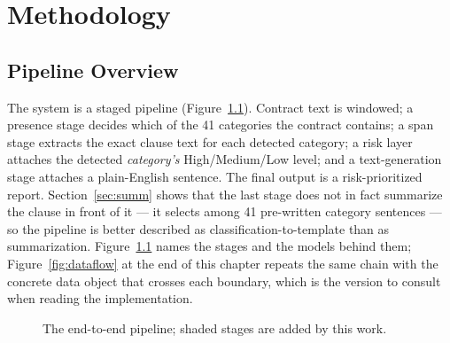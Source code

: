 \chapter{Methodology}

\section{Pipeline Overview}
The system is a staged pipeline (Figure~\ref{fig:pipeline}). Contract text is windowed; a presence stage decides which of the 41 categories the contract contains; a span stage extracts the exact clause text for each detected category; a risk layer attaches the detected \emph{category's} High/Medium/Low level; and a text-generation stage attaches a plain-English sentence. The final output is a risk-prioritized report. Section~\ref{sec:summ} shows that the last stage does not in fact summarize the clause in front of it --- it selects among 41 pre-written category sentences --- so the pipeline is better described as classification-to-template than as summarization. Figure~\ref{fig:pipeline} names the stages and the models behind them; Figure~\ref{fig:dataflow} at the end of this chapter repeats the same chain with the concrete data object that crosses each boundary, which is the version to consult when reading the implementation.

\begin{figure}[ht]
\centering
{}
\caption{The end-to-end pipeline; shaded stages are added by this work.}
\label{fig:pipeline}
\end{figure}

